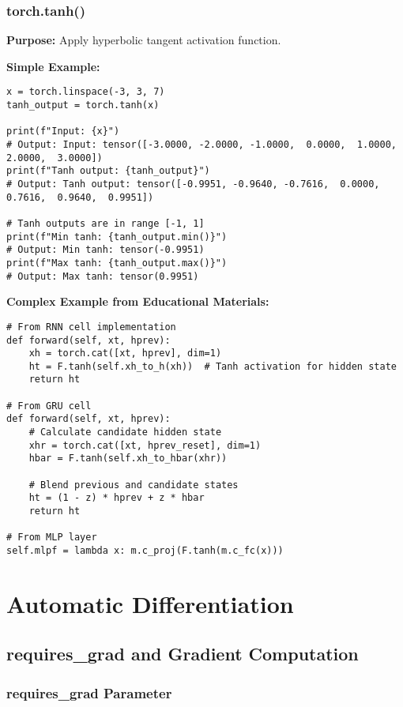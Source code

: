 \documentclass[11pt,a4paper]{book}
\begin{document}
\subsection{torch.tanh()}

\textbf{Purpose:} Apply hyperbolic tangent activation function.

\textbf{Simple Example:}
\begin{verbatim}
x = torch.linspace(-3, 3, 7)
tanh_output = torch.tanh(x)

print(f"Input: {x}")
# Output: Input: tensor([-3.0000, -2.0000, -1.0000,  0.0000,  1.0000,  2.0000,  3.0000])
print(f"Tanh output: {tanh_output}")
# Output: Tanh output: tensor([-0.9951, -0.9640, -0.7616,  0.0000,  0.7616,  0.9640,  0.9951])

# Tanh outputs are in range [-1, 1]
print(f"Min tanh: {tanh_output.min()}")
# Output: Min tanh: tensor(-0.9951)
print(f"Max tanh: {tanh_output.max()}")
# Output: Max tanh: tensor(0.9951)
\end{verbatim}

\textbf{Complex Example from Educational Materials:}
\begin{verbatim}
# From RNN cell implementation
def forward(self, xt, hprev):
    xh = torch.cat([xt, hprev], dim=1)
    ht = F.tanh(self.xh_to_h(xh))  # Tanh activation for hidden state
    return ht

# From GRU cell
def forward(self, xt, hprev):
    # Calculate candidate hidden state
    xhr = torch.cat([xt, hprev_reset], dim=1)
    hbar = F.tanh(self.xh_to_hbar(xhr))
    
    # Blend previous and candidate states
    ht = (1 - z) * hprev + z * hbar
    return ht

# From MLP layer
self.mlpf = lambda x: m.c_proj(F.tanh(m.c_fc(x)))
\end{verbatim}

\chapter{Automatic Differentiation}

\section{requires\_grad and Gradient Computation}

\subsection{requires\_grad Parameter}
\end{document}
